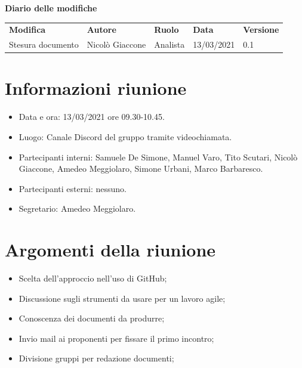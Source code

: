 \documentclass[a4paper]{article}
\begin{document}
        \begin{center}
            \textbf{\Large Diario delle modifiche}\\
            \vspace{10px}
            \begin{table}[h!]
            \centering
            \renewcommand{\arraystretch}{1.8}
            \begin{tabular}{p{150px} p{90px} p{50px} p{60px} p{45px}}
                \rowcolor{logo!70} \textbf{Modifica} & \textbf{Autore} & \textbf{Ruolo} & \textbf{Data} & \textbf{Versione}\\
                Stesura documento & Nicolò Giaccone & Analista & 13/03/2021 & 0.1\\   
            \end{tabular}
        \end{table}
        \end{center}
    
        \newpage
        \tableofcontents
        \newpage

    \section{Informazioni riunione}
    \begin{itemize}
        \item Data e ora: 13/03/2021 ore 09.30-10.45.
        \item Luogo: Canale Discord del gruppo tramite videochiamata.
        \item Partecipanti interni: Samuele De Simone, Manuel Varo, Tito Scutari, Nicolò Giaccone, Amedeo Meggiolaro, Simone Urbani, Marco Barbaresco.
        \item Partecipanti esterni: nessuno.
        \item Segretario: Amedeo Meggiolaro.
    \end{itemize}
    \section{Argomenti della riunione}
    \begin{itemize}
        \item Scelta dell'approccio nell'uso di GitHub;
        \item Discussione sugli strumenti da usare per un lavoro agile;
        \item Conoscenza dei documenti da produrre;
        \item Invio mail ai proponenti per fissare il primo incontro;
        \item Divisione gruppi per redazione documenti;
    \end{itemize}
\end{document}
